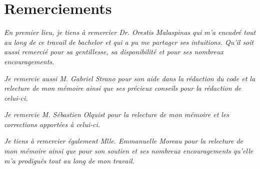 \chapter*{Remerciements} %

\textit{En premier lieu, je tiens à remercier Dr. Orestis Malaspinas qui
m'a encadré tout au long de ce travail de bachelor et qui a pu me partager ses
intuitions. Qu'il soit aussi remercié pour sa gentillesse, sa disponibilité et
pour ses nombreux encouragements.}

\textit{Je remercie aussi M. Gabriel Strano pour son aide dans la rédaction du
	code et	la relecture de mon mémoire ainsi que ses précieux conseils pour la
rédaction de celui-ci.}

\textit{Je remercie M. Sébastien Olquist pour la relecture de mon
	mémoire et les corrections apportées à celui-ci.}

\textit{Je tiens à remercier également Mlle. Emmanuelle Moreau pour la 
	relecture de mon mémoire ainsi que pour son soutien et ses nombreux 
	encouragements qu'elle m'a prodigués tout au long de mon travail.}


